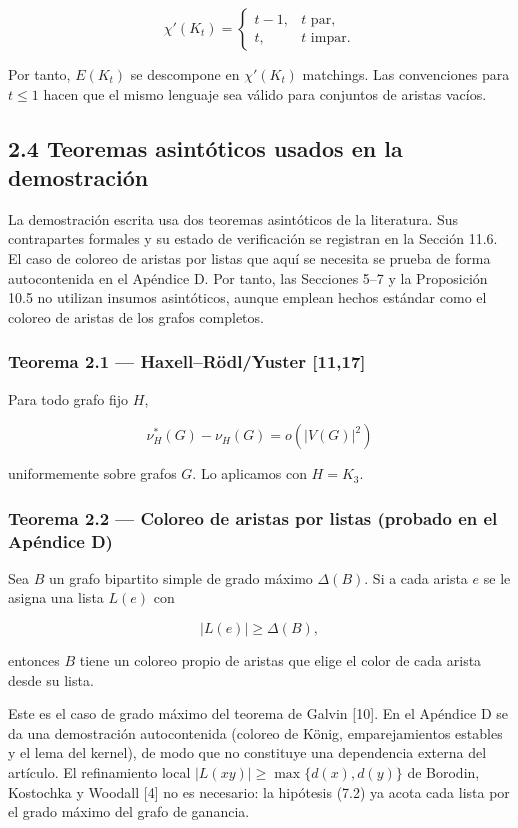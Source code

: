 \documentclass[
  spanish,
  11pt,
  a4paper,
]{article}
\begin{document}
\[
\chi'(K_t)
=
\begin{cases}
t-1,&t\text{ par},\\
t,&t\text{ impar}.
\end{cases}
\tag{2.2}
\]

Por tanto, \(E(K_t)\) se descompone en \(\chi'(K_t)\) matchings. Las convenciones para \(t\le1\) hacen que el mismo lenguaje sea válido para conjuntos de aristas vacíos.

\subsection{2.4 Teoremas asintóticos usados en la demostración}\label{teoremas-asintuxf3ticos-usados-en-la-demostraciuxf3n}

La demostración escrita usa dos teoremas asintóticos de la literatura. Sus contrapartes formales y su estado de verificación se registran en la Sección 11.6. El caso de coloreo de aristas por listas que aquí se necesita se prueba de forma autocontenida en el Apéndice D. Por tanto, las Secciones 5--7 y la Proposición 10.5 no utilizan insumos asintóticos, aunque emplean hechos estándar como el coloreo de aristas de los grafos completos.

\subsubsection{Teorema 2.1 --- Haxell--Rödl/Yuster {[}11,17{]}}\label{teorema-2.1-haxellruxf6dlyuster-1117}

Para todo grafo fijo \(H\),

\[
\nu_H^*(G)-\nu_H(G)=o(|V(G)|^2)
\]

uniformemente sobre grafos \(G\). Lo aplicamos con \(H=K_3\).

\subsubsection{Teorema 2.2 --- Coloreo de aristas por listas (probado en el Apéndice D)}\label{teorema-2.2-coloreo-de-aristas-por-listas-probado-en-el-apuxe9ndice-d}

Sea \(B\) un grafo bipartito simple de grado máximo \(\Delta(B)\). Si a cada arista \(e\) se le asigna una lista \(L(e)\) con

\[
|L(e)|\ge\Delta(B),
\]

entonces \(B\) tiene un coloreo propio de aristas que elige el color de cada arista desde su lista.

Este es el caso de grado máximo del teorema de Galvin {[}10{]}. En el Apéndice D se da una demostración autocontenida (coloreo de König, emparejamientos estables y el lema del kernel), de modo que no constituye una dependencia externa del artículo. El refinamiento local \(|L(xy)|\ge\max\{d(x),d(y)\}\) de Borodin, Kostochka y Woodall {[}4{]} no es necesario: la hipótesis (7.2) ya acota cada lista por el grado máximo del grafo de ganancia.
\end{document}
